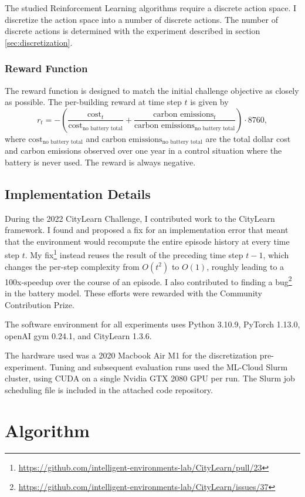 The studied Reinforcement Learning algorithms require a discrete action space.
I discretize the action space into a number of discrete actions. The number of discrete actions is determined with the experiment described in section \ref{sec:discretization}.

\subsubsection{Reward Function}
The reward function is designed to match the initial challenge objective as closely as possible.
The per-building reward at time step $t$ is given by
$$r_t = - \left(\frac{\text{cost}_t}{\text{cost}_\text{no battery total}}
    + \frac{\text{carbon emissions}_t}{\text{carbon emissions}_\text{no battery total}}\right) \cdot 8760,$$
where $\text{cost}_\text{no battery total}$ and $\text{carbon emissions}_\text{no battery total}$ are the total dollar cost and carbon emissions observed over one year in a control situation where the battery is never used.
The reward is always negative.

\subsection{Implementation Details}
During the 2022 CityLearn Challenge, I contributed work to the CityLearn framework.
I found and proposed a fix for an implementation error that meant that the environment would recompute the entire episode history at every time step $t$.
My fix\footnote{\url{https://github.com/intelligent-environments-lab/CityLearn/pull/23}} instead reuses the result of the preceding time step $t-1$, which changes the per-step complexity from $O(t^2)$ to $O(1)$, roughly leading to a 100x-speedup over the course of an episode.
I also contributed to finding a bug\footnote{\url{https://github.com/intelligent-environments-lab/CityLearn/issues/37}} in the battery model.
These efforts were rewarded with the Community Contribution Prize.

The software environment for all experiments uses Python 3.10.9, PyTorch 1.13.0, openAI gym 0.24.1, and CityLearn 1.3.6.

The hardware used was a 2020 Macbook Air M1 for the discretization pre-experiment. Tuning and subsequent evaluation runs used the ML-Cloud Slurm cluster, using CUDA on a single Nvidia GTX 2080 GPU per run. The Slurm job scheduling file is included in the attached code repository.


\section{Algorithm}
